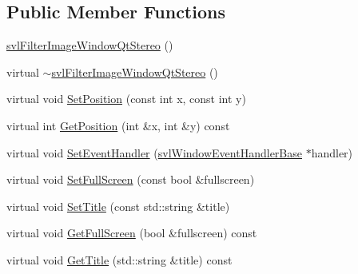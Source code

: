 \subsection*{Public Member Functions}
\begin{DoxyCompactItemize}
\item 
\hyperlink{classsvl_filter_image_window_qt_stereo_a1c3219fea5832e341ea8c7123519ed93}{svl\-Filter\-Image\-Window\-Qt\-Stereo} ()
\item 
virtual \hyperlink{classsvl_filter_image_window_qt_stereo_a54e636cbe5543397079145de1431325f}{$\sim$svl\-Filter\-Image\-Window\-Qt\-Stereo} ()
\item 
virtual void \hyperlink{classsvl_filter_image_window_qt_stereo_af57d36ad53070804c92b3162502766a2}{Set\-Position} (const int x, const int y)
\item 
virtual int \hyperlink{classsvl_filter_image_window_qt_stereo_a306952a3c4c361f9778a97a93cf2963a}{Get\-Position} (int \&x, int \&y) const 
\item 
virtual void \hyperlink{classsvl_filter_image_window_qt_stereo_a0439c539d1eb7e4e59e19e929d6c93be}{Set\-Event\-Handler} (\hyperlink{classsvl_window_event_handler_base}{svl\-Window\-Event\-Handler\-Base} $\ast$handler)
\item 
virtual void \hyperlink{classsvl_filter_image_window_qt_stereo_a6b072cbc8b4ebfdc6788eaf053d2ba07}{Set\-Full\-Screen} (const bool \&fullscreen)
\item 
virtual void \hyperlink{classsvl_filter_image_window_qt_stereo_af370ca31f19b615b509ede8240489542}{Set\-Title} (const std\-::string \&title)
\item 
virtual void \hyperlink{classsvl_filter_image_window_qt_stereo_a34703c38e840d5f206098c89f55ab4b9}{Get\-Full\-Screen} (bool \&fullscreen) const 
\item 
virtual void \hyperlink{classsvl_filter_image_window_qt_stereo_ac2f05d762302e4bf94d3d9897aa6d8c5}{Get\-Title} (std\-::string \&title) const 
\end{DoxyCompactItemize}
